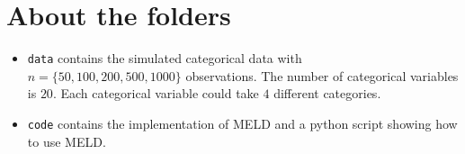 \documentclass[]{article}
\begin{document}
\section{About the folders}\label{about-the-folders}

\begin{itemize}
\item
  \texttt{data} contains the simulated categorical data with $n =
  \{50,100,200,500,1000\}$ observations. The number of categorical
  variables is $20$. Each categorical variable could take $4$
  different categories.
\item
  \texttt{code} contains the implementation of MELD and a python script
  showing how to use MELD.
\end{itemize}
\end{document}
